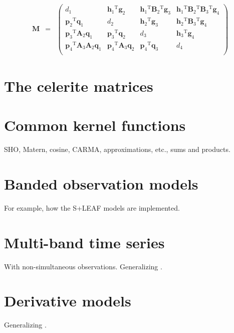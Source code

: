 \documentclass[modern]{aastex631}
\newcommand{\project}[1]{\textsf{#1}}
\newcommand{\mv}[1]{\ensuremath{\boldsymbol{#1}}}
\newcommand{\mm}[1]{\ensuremath{\boldsymbol{#1}}}
\newcommand{\T}{\ensuremath{^\mathrm{T}}}
\begin{document}
\begin{eqnarray}
    \mm{M} &=& \left(\begin{array}{cccc}
            d_1                                & \mv{h}_1\T\mv{g}_2         & \mv{h}_1\T\mm{B}_2\T\mv{g}_3 & \mv{h}_1\T\mm{B}_2\T\mm{B}_3\T\mv{g}_4 \\
            \mv{p}_2\T\mv{q}_1                 & d_2                        & \mv{h}_2\T\mv{g}_3           & \mv{h}_2\T\mm{B}_3\T\mv{g}_4           \\
            \mv{p}_3\T\mm{A}_2\mv{q}_1         & \mv{p}_3\T \mv{q}_2        & d_3                          & \mv{h}_3\T\mv{g}_4                     \\
            \mv{p}_4\T\mm{A}_3\mm{A}_2\mv{q}_1 & \mv{p}_4\T\mm{A}_3\mv{q}_2 & \mv{p}_4\T\mv{q}_3           & d_4                                    \\
        \end{array}\right)
\end{eqnarray}

\section{The \project{celerite} matrices}

\section{Common kernel functions}

SHO, Matern, cosine, CARMA, approximations, etc., sums and products.

\section{Banded observation models}

For example, how the \project{S+LEAF} models are implemented. \citep{Delisle:2020}

\section{Multi-band time series}

With non-simultaneous observations. Generalizing \citep{Gordon:2020}.

\section{Derivative models}

Generalizing \citep{Delisle:2022}.
\end{document}
